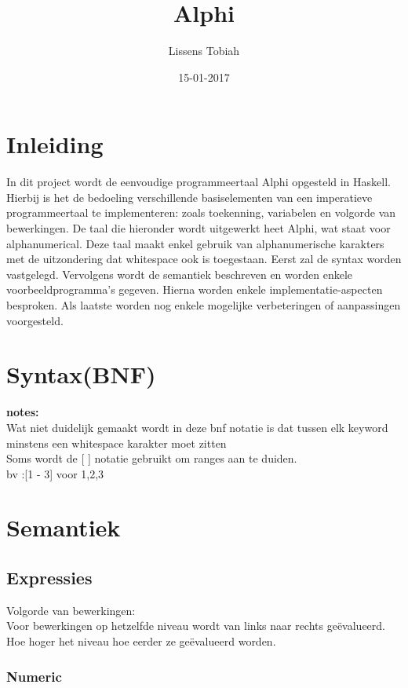 \documentclass[a4paper,10pt]{article}
\title{Alphi}
\author{Lissens Tobiah}
\date{15-01-2017}
\begin{document}
\maketitle
\newpage
{}
\tableofcontents

\newpage
\section{Inleiding}
In dit project wordt de eenvoudige programmeertaal Alphi opgesteld in Haskell.
Hierbij is het de bedoeling verschillende basiselementen van een imperatieve programmeertaal te implementeren:
zoals toekenning, variabelen en volgorde van bewerkingen.
De taal die hieronder wordt uitgewerkt heet Alphi, wat staat voor alphanumerical.
Deze taal maakt enkel gebruik van alphanumerische karakters met de uitzondering dat whitespace ook is toegestaan.
Eerst zal de syntax worden vastgelegd.
Vervolgens wordt de semantiek beschreven en worden enkele voorbeeldprogramma's gegeven.
Hierna worden enkele implementatie-aspecten besproken.
Als laatste worden nog enkele mogelijke verbeteringen of aanpassingen voorgesteld.

\newpage
\section{Syntax(BNF)}
    \textbf{notes:} \\
    Wat niet duidelijk gemaakt wordt in deze bnf notatie is dat tussen elk keyword minstens een whitespace karakter moet zitten\\
    Soms wordt de [ ] notatie gebruikt om ranges aan te duiden.\\
    bv  :[1 - 3] voor 1,2,3
    

    

\section{Semantiek}
  \subsection{Expressies}
    Volgorde van bewerkingen:\\
    Voor bewerkingen op hetzelfde niveau wordt van links naar rechts geëvalueerd.
    Hoe hoger het niveau hoe eerder ze geëvalueerd worden. 
    \subsubsection{Numeric}
    
\end{document}
